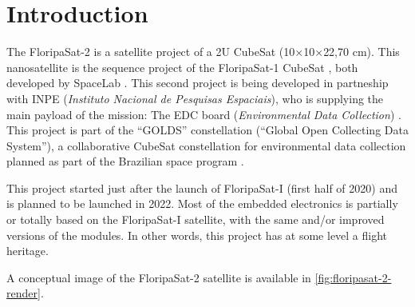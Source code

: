 %
%
%
%
%

%
%
%
%
%
%

\chapter{Introduction} \label{ch:introduction}

The FloripaSat-2 is a satellite project of a 2U CubeSat (10$\times$10$\times$22,70 cm). This nanosatellite is the sequence project of the FloripaSat-1 CubeSat \cite{floripasat}, both developed by SpaceLab \cite{spacelab}. This second project is being developed in partneship with INPE (\textit{Instituto Nacional de Pesquisas Espaciais}), who is supplying the main payload of the mission: The EDC board (\textit{Environmental Data Collection}) \cite{edc}. This project is part of the ``GOLDS'' constellation (``Global Open Collecting Data System''), a collaborative CubeSat constellation for environmental data collection planned as part of the Brazilian space program \cite{golds}.

This project started just after the launch of FloripaSat-I (first half of 2020) and is planned to be launched in 2022. Most of the embedded electronics is partially or totally based on the FloripaSat-I satellite, with the same and/or improved versions of the modules. In other words, this project has at some level a flight heritage.

A conceptual image of the FloripaSat-2 satellite is available in \autoref{fig:floripasat-2-render}.

